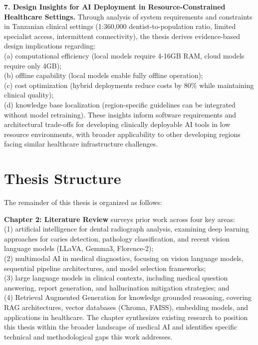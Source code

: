 \documentclass[12pt,a4paper]{report}
\begin{document}
	\textbf{7. Design Insights for AI Deployment in Resource-Constrained Healthcare Settings.}
	Through analysis of system requirements and constraints in Tanzanian clinical settings (1:360,000 dentist-to-population ratio, limited specialist access, intermittent connectivity), the thesis derives evidence-based design implications regarding: \\
	(a) computational efficiency (local models require 4-16GB RAM, cloud models require only 4GB); \\
	(b) offline capability (local models enable fully offline operation); \\
	(c) cost optimization (hybrid deployments reduce costs by 80\% while maintaining clinical quality); \\
	(d) knowledge base localization (region-specific guidelines can be integrated without model retraining). These insights inform software requirements and architectural trade-offs for developing clinically deployable AI tools in low resource environments, with broader applicability to other developing regions facing similar healthcare infrastructure challenges.
	
	\section{Thesis Structure}
	The remainder of this thesis is organized as follows:
	
	\textbf{Chapter 2: Literature Review} surveys prior work across four key areas: \\
	(1) artificial intelligence for dental radiograph analysis, examining deep learning approaches for caries detection, pathology classification, and recent vision language models (LLaVA, Gemma3, Florence-2); \\
	(2) multimodal AI in medical diagnostics, focusing on vision language models, sequential pipeline architectures, and model selection frameworks; \\
	(3) large language models in clinical contexts, including medical question answering, report generation, and hallucination mitigation strategies; and \\
	(4) Retrieval Augmented Generation for knowledge grounded reasoning, covering RAG architectures, vector databases (Chroma, FAISS), embedding models, and applications in healthcare. The chapter synthesizes existing research to position this thesis within the broader landscape of medical AI and identifies specific technical and methodological gaps this work addresses.
	
\end{document}
